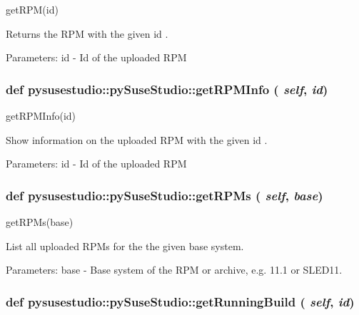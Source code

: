 \label{classpysusestudio_1_1py_suse_studio_a57ade7463c2ed61ba29b096f7a084b44}
\begin{DoxyVerb}getRPM(id)

       Returns the RPM with the given id .
        
            Parameters:
id - Id of the uploaded RPM

\end{DoxyVerb}
 \hypertarget{classpysusestudio_1_1py_suse_studio_a351aea7ec7f00979680d2a9a1ad116bc}{
\subsubsection[{getRPMInfo}]{\setlength{\rightskip}{0pt plus 5cm}def pysusestudio::pySuseStudio::getRPMInfo ( {\em self}, \/   {\em id})}}
\label{classpysusestudio_1_1py_suse_studio_a351aea7ec7f00979680d2a9a1ad116bc}
\begin{DoxyVerb}getRPMInfo(id)

       Show information on the uploaded RPM with the given id .
        
            Parameters:
id - Id of the uploaded RPM

\end{DoxyVerb}
 \hypertarget{classpysusestudio_1_1py_suse_studio_a976d655984cc08a73ab2a37192012d34}{
\subsubsection[{getRPMs}]{\setlength{\rightskip}{0pt plus 5cm}def pysusestudio::pySuseStudio::getRPMs ( {\em self}, \/   {\em base})}}
\label{classpysusestudio_1_1py_suse_studio_a976d655984cc08a73ab2a37192012d34}
\begin{DoxyVerb}getRPMs(base)

        List all uploaded RPMs for the the given base system.
        
            Parameters:
base - Base system of the RPM or archive, e.g. 11.1 or SLED11.

\end{DoxyVerb}
 \hypertarget{classpysusestudio_1_1py_suse_studio_a1b5b2d3eb030841b1d50117cb081d935}{
\subsubsection[{getRunningBuild}]{\setlength{\rightskip}{0pt plus 5cm}def pysusestudio::pySuseStudio::getRunningBuild ( {\em self}, \/   {\em id})}}
